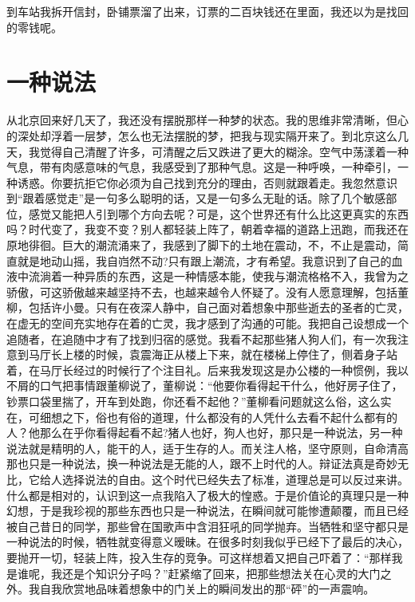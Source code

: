 \documentclass[12pt,oneside]{book}
\begin{document}
到车站我拆开信封，卧铺票溜了出来，订票的二百块钱还在里面，我还以为是找回的零钱呢。


\chapter{一种说法}

从北京回来好几天了，我还没有摆脱那样一种梦的状态。我的思维非常清晰，但心的深处却浮着一层梦，怎么也无法摆脱的梦，把我与现实隔开来了。到北京这么几天，我觉得自己清醒了许多，可清醒之后又跌进了更大的糊涂。空气中荡漾着一种气息，带有肉感意味的气息，我感受到了那种气息。这是一种呼唤，一种牵引，一种诱惑。你要抗拒它你必须为自己找到充分的理由，否则就跟着走。我忽然意识到``跟着感觉走''是一句多么聪明的话，又是一句多么无耻的话。除了几个敏感部位，感觉又能把人引到哪个方向去呢？可是，这个世界还有什么比这更真实的东西吗？时代变了，我变不变？别人都轻装上阵了，朝着幸福的道路上迅跑，而我还在原地徘徊。巨大的潮流涌来了，我感到了脚下的土地在震动，不，不止是震动，简直就是地动山摇，我自岿然不动?只有跟上潮流，才有希望。我意识到了自己的血液中流淌着一种异质的东西，这是一种情感本能，使我与潮流格格不入，我曾为之骄傲，可这骄傲越来越坚持不去，也越来越令人怀疑了。没有人愿意理解，包括董柳，包括许小曼。只有在夜深人静中，自己面对着想象中那些逝去的圣者的亡灵，在虚无的空间充实地存在着的亡灵，我才感到了沟通的可能。我把自己设想成一个追随者，在追随中才有了找到归宿的感觉。我看不起那些猪人狗人们，有一次我注意到马厅长上楼的时候，袁震海正从楼上下来，就在楼梯上停住了，侧着身子站着，在马厅长经过的时候行了个注目礼。后来我发现这是办公楼的一种惯例，我以不屑的口气把事情跟董柳说了，董柳说：``他要你看得起干什么，他好房子住了，钞票口袋里揣了，开车到处跑，你还看不起他？''董柳看问题就这么俗，这么实在，可细想之下，俗也有俗的道理，什么都没有的人凭什么去看不起什么都有的人？他那么在乎你看得起看不起?猪人也好，狗人也好，那只是一种说法，另一种说法就是精明的人，能干的人，适于生存的人。而关注人格，坚守原则，自命清高那也只是一种说法，换一种说法是无能的人，跟不上时代的人。辩证法真是奇妙无比，它给人选择说法的自由。这个时代已经失去了标准，道理总是可以反过来讲。什么都是相对的，认识到这一点我陷入了极大的惶惑。于是价值论的真理只是一种幻想，于是我珍视的那些东西也只是一种说法，在瞬间就可能惨遭颠覆，而且已经被自己昔日的同学，那些曾在国歌声中含泪狂吼的同学抛弃。当牺牲和坚守都只是一种说法的时候，牺牲就变得意义暧昧。在很多时刻我似乎已经下了最后的决心，要抛开一切，轻装上阵，投入生存的竞争。可这样想着又把自己吓着了：``那样我是谁呢，我还是个知识分子吗？''赶紧缩了回来，把那些想法关在心灵的大门之外。我自我欣赏地品味着想象中的门关上的瞬间发出的那``砰''的一声震响。
\end{document}
